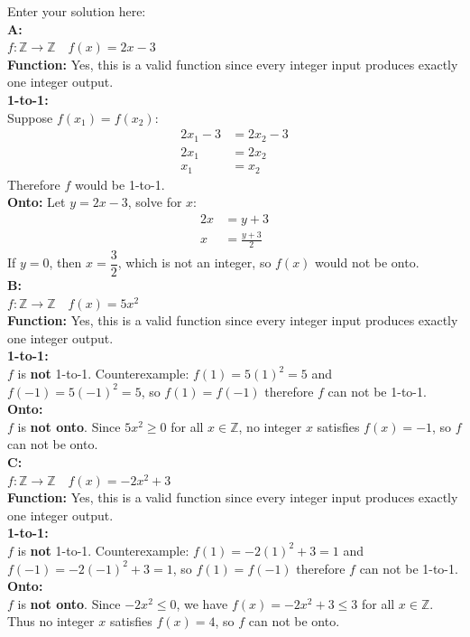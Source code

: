 \documentclass[10pt]{exam}
\begin{document}
\begin{questions}
\begin{solution}
    Enter your solution here: \\
    \textbf{A:}\\
    $f: \mathbb{Z} \rightarrow \mathbb{Z} \quad f(x) = 2x - 3$\\
    \textbf{Function:} Yes, this is a valid function since every integer input produces exactly one integer output.\\
    \textbf{1-to-1:}\\
    Suppose $f(x_1) = f(x_2)$:
    \begin{align*}
    2x_1 - 3 &= 2x_2 - 3 \\
    2x_1 &= 2x_2 \\
    x_1 &= x_2
    \end{align*}
    Therefore $f$ would be 1-to-1.\\
    \textbf{Onto:}
    Let $y = 2x - 3$, solve for $x$:
    \begin{align*}
    2x &= y + 3 \\
    x &= \frac{y + 3}{2}
    \end{align*}
    If $y = 0$, then $x = \dfrac{3}{2}$, which is not an integer, so $f(x)$ would not be onto.\\
    
    \textbf{B:}\\
    $f: \mathbb{Z} \rightarrow \mathbb{Z} \quad f(x) = 5x^2$\\
    \textbf{Function:} Yes, this is a valid function since every integer input produces exactly one integer output.\\
    \textbf{1-to-1:}\\
    $f$ is \textbf{not} 1-to-1. Counterexample: $f(1) = 5(1)^2 = 5$ and $f(-1) = 5(-1)^2 = 5$, so $f(1) = f(-1)$ therefore $f$ can not be 1-to-1.\\
    \textbf{Onto:}\\
    $f$ is \textbf{not onto}. Since $5x^2 \geq 0$ for all $x \in \mathbb{Z}$, no integer $x$ satisfies $f(x) = -1$, so $f$ can not be onto.\\

    \textbf{C:}\\
    $f: \mathbb{Z} \rightarrow \mathbb{Z} \quad f(x) = -2x^2+3$\\
    \textbf{Function:} Yes, this is a valid function since every integer input produces exactly one integer output.\\
    \textbf{1-to-1:}\\
    $f$ is \textbf{not} 1-to-1. Counterexample: $f(1) = -2(1)^2 + 3 = 1$ and $f(-1) = -2(-1)^2 + 3 = 1$, so $f(1) = f(-1)$ therefore $f$ can not be 1-to-1.\\
    \textbf{Onto:}\\
    $f$ is \textbf{not onto}. Since $-2x^2 \leq 0$, we have $f(x) = -2x^2 + 3 \leq 3$ for all $x \in \mathbb{Z}$. Thus no integer $x$ satisfies $f(x) = 4$, so $f$ can not be onto.\\


\end{solution}
\end{questions}
\end{document}
